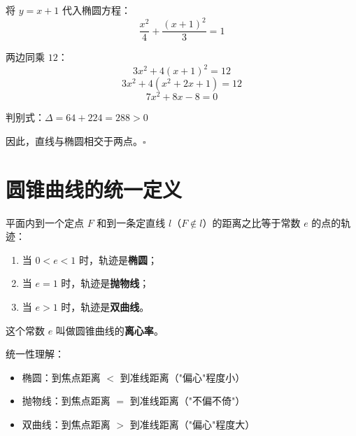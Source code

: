 将 $y = x + 1$ 代入椭圆方程：
\[ \frac{x^2}{4} + \frac{(x+1)^2}{3} = 1 \]

两边同乘 $12$：
\[ 3x^2 + 4(x+1)^2 = 12 \]
\[ 3x^2 + 4(x^2 + 2x + 1) = 12 \]
\[ 7x^2 + 8x - 8 = 0 \]

判别式：$\Delta = 64 + 224 = 288 > 0$

因此，直线与椭圆相交于两点。\hfill $\square$

\section{圆锥曲线的统一定义}

\begin{definition}[圆锥曲线的统一定义]
平面内到一个定点 $F$ 和到一条定直线 $l$（$F \notin l$）的距离之比等于常数 $e$ 的点的轨迹：
\begin{enumerate}
    \item 当 $0 < e < 1$ 时，轨迹是\textbf{椭圆}；
    \item 当 $e = 1$ 时，轨迹是\textbf{抛物线}；
    \item 当 $e > 1$ 时，轨迹是\textbf{双曲线}。
\end{enumerate}
这个常数 $e$ 叫做圆锥曲线的\textbf{离心率}。
\end{definition}

\begin{note}
统一性理解：
\begin{itemize}
    \item 椭圆：到焦点距离 $<$ 到准线距离（"偏心"程度小）
    \item 抛物线：到焦点距离 $=$ 到准线距离（"不偏不倚"）
    \item 双曲线：到焦点距离 $>$ 到准线距离（"偏心"程度大）
\end{itemize}
\end{note}
